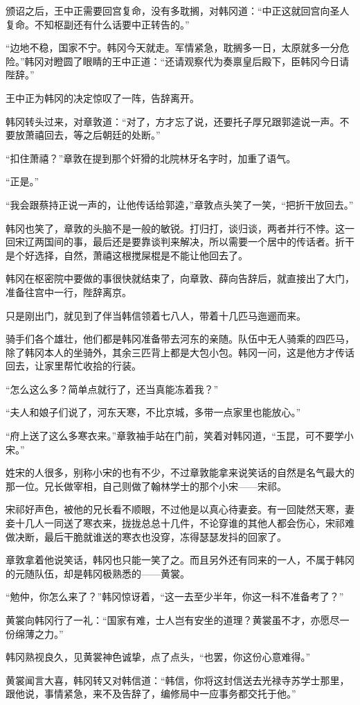 颁诏之后，王中正需要回宫复命，没有多耽搁，对韩冈道：“中正这就回宫向圣人复命。不知枢副还有什么话要中正转告的。”

“边地不稳，国家不宁。韩冈今天就走。军情紧急，耽搁多一日，太原就多一分危险。”韩冈对瞪圆了眼睛的王中正道：“还请观察代为奏禀皇后殿下，臣韩冈今日请陛辞。”

王中正为韩冈的决定惊叹了一阵，告辞离开。

韩冈转头过来，对章敦道：“对了，方才忘了说，还要托子厚兄跟郭逵说一声。不要放萧禧回去，等之后朝廷的处断。”

“扣住萧禧？”章敦在提到那个奸猾的北院林牙名字时，加重了语气。

“正是。”

“我会跟蔡持正说一声的，让他传话给郭逵，”章敦点头笑了一笑，“把折干放回去。”

韩冈也笑了，章敦的头脑不是一般的敏锐。打归打，谈归谈，两者并行不悖。这一回宋辽两国间的事，最后还是要靠谈判来解决，所以需要一个居中的传话者。折干是个好选择，自然，萧禧这根搅屎棍是不能让他回去了。

韩冈在枢密院中要做的事很快就结束了，向章敦、薛向告辞后，就直接出了大门，准备往宫中一行，陛辞离京。

只是刚出门，就见到了伴当韩信领着七八人，带着十几匹马迤逦而来。

骑手们各个雄壮，他们都是韩冈准备带去河东的亲随。队伍中无人骑乘的四匹马，除了韩冈本人的坐骑外，其余三匹背上都是大包小包。韩冈一问，这是他方才传话回去，让家里帮忙收拾的行装。

“怎么这么多？简单点就行了，还当真能冻着我？”

“夫人和娘子们说了，河东天寒，不比京城，多带一点家里也能放心。”

“府上送了这么多寒衣来。”章敦袖手站在门前，笑着对韩冈道，“玉昆，可不要学小宋。”

姓宋的人很多，别称小宋的也有不少，不过章敦能拿来说笑话的自然是名气最大的那一位。兄长做宰相，自己则做了翰林学士的那个小宋——宋祁。

宋祁好声色，被他的兄长看不顺眼，不过他是以真心待妻妾。有一回陡然天寒，妻妾十几人一同送了寒衣来，拢拢总总十几件，不论穿谁的其他人都会伤心，宋祁难做决断，最后干脆就谁送的寒衣也没穿，冻得瑟瑟发抖的回家了。

章敦拿着他说笑话，韩冈也只能一笑了之。而且另外还有同来的一人，不属于韩冈的元随队伍，却是韩冈极熟悉的——黄裳。

“勉仲，你怎么来了？”韩冈惊讶着，“这一去至少半年，你这一科不准备考了？”

黄裳向韩冈行了一礼：“国家有难，士人岂有安坐的道理？黄裳虽不才，亦愿尽一份绵薄之力。”

韩冈熟视良久，见黄裳神色诚挚，点了点头，“也罢，你这份心意难得。”

黄裳闻言大喜，韩冈转又对韩信道：“韩信，你将这封信送去光禄寺苏学士那里，跟他说，事情紧急，来不及告辞了，编修局中一应事务都交托于他。”

